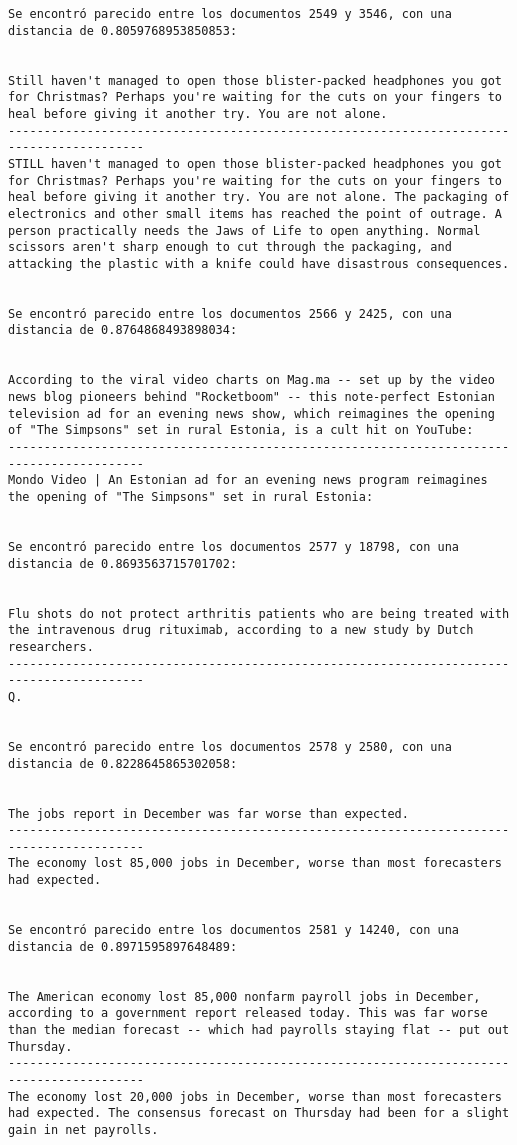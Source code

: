 \documentclass[11pt]{article}
\begin{document}
\begin{Verbatim}[commandchars=\\\{\}]
Se encontró parecido entre los documentos 2549 y 3546, con una distancia de 0.8059768953850853:


Still haven't managed to open those blister-packed headphones you got for Christmas? Perhaps you're waiting for the cuts on your fingers to heal before giving it another try. You are not alone.
-----------------------------------------------------------------------------------------
STILL haven't managed to open those blister-packed headphones you got for Christmas? Perhaps you're waiting for the cuts on your fingers to heal before giving it another try. You are not alone. The packaging of electronics and other small items has reached the point of outrage. A person practically needs the Jaws of Life to open anything. Normal scissors aren't sharp enough to cut through the packaging, and attacking the plastic with a knife could have disastrous consequences.


Se encontró parecido entre los documentos 2566 y 2425, con una distancia de 0.8764868493898034:


According to the viral video charts on Mag.ma -- set up by the video news blog pioneers behind "Rocketboom" -- this note-perfect Estonian television ad for an evening news show, which reimagines the opening of "The Simpsons" set in rural Estonia, is a cult hit on YouTube:
-----------------------------------------------------------------------------------------
Mondo Video | An Estonian ad for an evening news program reimagines the opening of "The Simpsons" set in rural Estonia:


Se encontró parecido entre los documentos 2577 y 18798, con una distancia de 0.8693563715701702:


Flu shots do not protect arthritis patients who are being treated with the intravenous drug rituximab, according to a new study by Dutch researchers.
-----------------------------------------------------------------------------------------
Q.


Se encontró parecido entre los documentos 2578 y 2580, con una distancia de 0.8228645865302058:


The jobs report in December was far worse than expected.
-----------------------------------------------------------------------------------------
The economy lost 85,000 jobs in December, worse than most forecasters had expected.


Se encontró parecido entre los documentos 2581 y 14240, con una distancia de 0.8971595897648489:


The American economy lost 85,000 nonfarm payroll jobs in December, according to a government report released today. This was far worse than the median forecast -- which had payrolls staying flat -- put out Thursday.
-----------------------------------------------------------------------------------------
The economy lost 20,000 jobs in December, worse than most forecasters had expected. The consensus forecast on Thursday had been for a slight gain in net payrolls.



\end{Verbatim}
\end{document}

